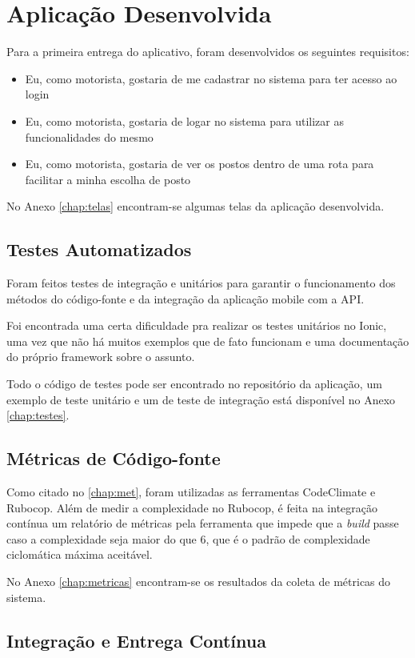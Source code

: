 \section{Aplicação Desenvolvida}
Para a primeira entrega do aplicativo, foram desenvolvidos os seguintes requisitos:
\begin{itemize}
    \item Eu, como motorista, gostaria de me cadastrar no sistema para ter acesso ao login
    \item Eu, como motorista, gostaria de logar no sistema para utilizar as funcionalidades do mesmo
    \item Eu, como motorista, gostaria de ver os postos dentro de uma rota para facilitar a minha escolha de posto
\end{itemize}
No Anexo \ref{chap:telas} encontram-se algumas telas da aplicação desenvolvida.

\subsection{Testes Automatizados}

Foram feitos testes de integração e unitários para garantir o funcionamento dos métodos do código-fonte e da integração da aplicação mobile com a API.

Foi encontrada uma certa dificuldade pra realizar os testes unitários no Ionic, uma vez que não há muitos exemplos que de fato funcionam e uma documentação do próprio framework sobre o assunto.

Todo o código de testes pode ser encontrado no repositório da aplicação, um exemplo de teste unitário e um de teste de integração está disponível no Anexo \ref{chap:testes}.

\subsection{Métricas de Código-fonte}

Como citado no \autoref{chap:met}, foram utilizadas as ferramentas CodeClimate e Rubocop. Além de medir a complexidade no Rubocop, é feita na integração contínua um relatório de métricas pela ferramenta que impede que a \textit{build} passe caso a complexidade seja maior do que 6, que é o padrão de complexidade ciclomática máxima aceitável.

No Anexo \ref{chap:metricas} encontram-se os resultados da coleta de métricas do sistema.

\subsection{Integração e Entrega Contínua}

